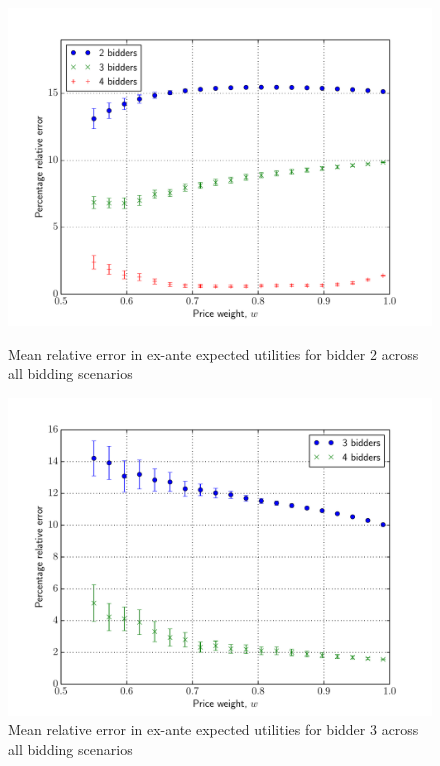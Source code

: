\begin{figure}[p!]
  \includegraphics[width=\figsize]{Approximation/Figures/compare_bidder_2}
  \caption{Mean relative error in ex-ante expected utilities for bidder 2 across all bidding scenarios}
  \label{fig:compare_bidder_2_approximation}
  \vspace{10mm}
  \includegraphics[width=\figsize]{Approximation/Figures/compare_bidder_3}
  \caption{Mean relative error in ex-ante expected utilities for bidder 3 across all bidding scenarios}
  \label{fig:compare_bidder_3_approximation}
\end{figure}

